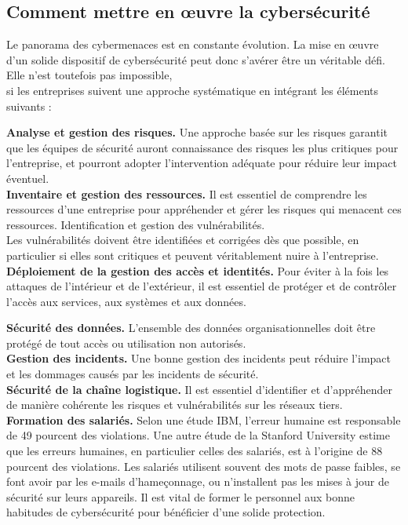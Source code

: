  \pagebreak
 \newpage
 \subsection{Comment mettre en œuvre la cybersécurité}
 Le panorama des cybermenaces est en constante évolution. La mise en œuvre d’un solide dispositif de cybersécurité peut donc s’avérer être un véritable défi. Elle n’est toutefois pas impossible,\\
  si les entreprises suivent une approche systématique en intégrant les éléments suivants :
  
  \textbf{Analyse et gestion des risques.} Une approche basée sur les risques garantit que les équipes de sécurité auront connaissance des risques les plus critiques pour l’entreprise, et pourront adopter l’intervention adéquate pour réduire leur impact éventuel.\\
  \textbf{Inventaire et gestion des ressources.} Il est essentiel de comprendre les ressources d’une entreprise pour appréhender et gérer les risques qui menacent ces ressources.
  Identification et gestion des vulnérabilités.\\ Les vulnérabilités doivent être identifiées et corrigées dès que possible, en particulier si elles sont critiques et peuvent véritablement nuire à l’entreprise.\\
  
  \textbf{Déploiement de la gestion des accès et identités.} Pour éviter à la fois les attaques de l’intérieur et de l’extérieur, il est essentiel de protéger et de contrôler l’accès aux services, aux systèmes et aux données.
  
  \textbf{Sécurité des données.} L’ensemble des données organisationnelles doit être protégé de tout accès ou utilisation non autorisés.\\
  
  \textbf{Gestion des incidents.} Une bonne gestion des incidents peut réduire l’impact et les dommages causés par les incidents de sécurité.\\
  
  \textbf{Sécurité de la chaîne logistique.} Il est essentiel d’identifier et d’appréhender de manière cohérente les risques et vulnérabilités sur les réseaux tiers.\\
  
  \textbf{Formation des salariés.} Selon une étude IBM, l’erreur humaine est responsable de 49 pourcent  des violations. Une autre étude de la Stanford University estime que les erreurs humaines, en particulier celles des salariés, est à l’origine de 88 pourcent des violations. Les salariés utilisent souvent des mots de passe faibles, se font avoir par les e-mails d’hameçonnage, ou n’installent pas les mises à jour de sécurité sur leurs appareils. Il est vital de former le personnel aux bonne habitudes de cybersécurité pour bénéficier d’une solide protection.\\
